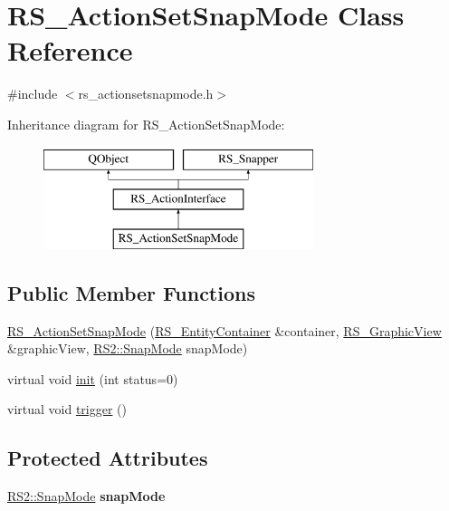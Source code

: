 \hypertarget{classRS__ActionSetSnapMode}{\section{R\-S\-\_\-\-Action\-Set\-Snap\-Mode Class Reference}
\label{classRS__ActionSetSnapMode}
}


{\ttfamily \#include $<$rs\-\_\-actionsetsnapmode.\-h$>$}

Inheritance diagram for R\-S\-\_\-\-Action\-Set\-Snap\-Mode\-:\begin{figure}[H]
\begin{center}
\leavevmode
\includegraphics[height=3.000000cm]{classRS__ActionSetSnapMode}
\end{center}
\end{figure}
\subsection*{Public Member Functions}
\begin{DoxyCompactItemize}
\item 
\hyperlink{classRS__ActionSetSnapMode_a64a04ec6240fa45d1eeb0cee6c65f40c}{R\-S\-\_\-\-Action\-Set\-Snap\-Mode} (\hyperlink{classRS__EntityContainer}{R\-S\-\_\-\-Entity\-Container} \&container, \hyperlink{classRS__GraphicView}{R\-S\-\_\-\-Graphic\-View} \&graphic\-View, \hyperlink{classRS2_ad79bb612dc7719b90e79b29298ffaf73}{R\-S2\-::\-Snap\-Mode} snap\-Mode)
\item 
virtual void \hyperlink{classRS__ActionSetSnapMode_aaa0778207f5640111596f691825d00f6}{init} (int status=0)
\item 
virtual void \hyperlink{classRS__ActionSetSnapMode_a2638e4603b0b01ee2e445309d22a0efe}{trigger} ()
\end{DoxyCompactItemize}
\subsection*{Protected Attributes}
\begin{DoxyCompactItemize}
\item 
\hypertarget{classRS__ActionSetSnapMode_a67f263a56b975d76cbfd8fb9ab68420d}{\hyperlink{classRS2_ad79bb612dc7719b90e79b29298ffaf73}{R\-S2\-::\-Snap\-Mode} {\bfseries snap\-Mode}}\label{classRS__ActionSetSnapMode_a67f263a56b975d76cbfd8fb9ab68420d}

\end{DoxyCompactItemize}
